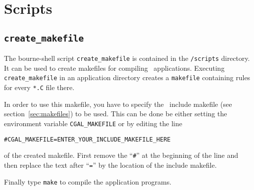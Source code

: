 \section{Scripts}

\subsection{\texttt{create\_makefile}}\label{sec:create_cgal_makefile}

The bourne-shell script \texttt{create\_makefile} is contained in the
\cgaldir\texttt{/scripts} directory. It can be used to create
makefiles for compiling \cgal\ applications. Executing
\texttt{create\_makefile} in an application directory creates a
\texttt{makefile} containing rules for every \texttt{*.C} file there.

In order to use this makefile, you have to specify the \cgal\ include
makefile (see section~\ref{sec:makefiles}) to be used. This can be
done be either setting the environment variable
\texttt{CGAL\_MAKEFILE} or by editing the line
\begin{alltt}
  # CGAL_MAKEFILE = ENTER_YOUR_INCLUDE_MAKEFILE_HERE
\end{alltt}
of the created makefile. First remove the ``\texttt{\#}'' at the
beginning of the line and then replace the text after ``\texttt{=}''
by the location of the include makefile. 

Finally type \texttt{make} to compile the application programs.

\lcTex{\end{appendix}}



